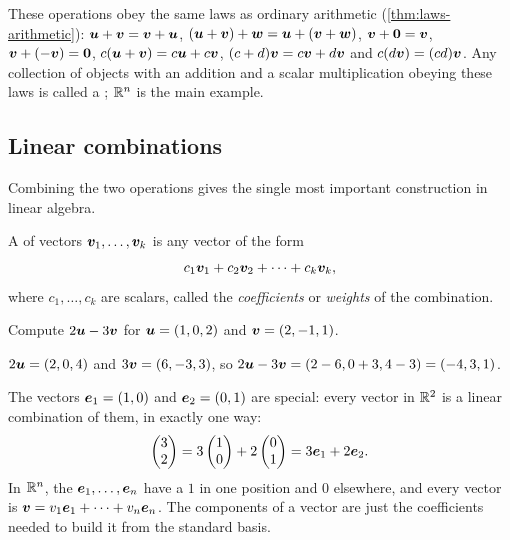 These operations obey the same laws as ordinary arithmetic
(\cref{thm:laws-arithmetic}): $\bm{u} + \bm{v} = \bm{v} + \bm{u}$,
$(\bm{u} + \bm{v}) + \bm{w} = \bm{u} + (\bm{v} + \bm{w})$, $\bm{v} + \bm{0} = \bm{v}$,
$\bm{v} + (-\bm{v}) = \bm{0}$, $c(\bm{u} + \bm{v}) = c\bm{u} + c\bm{v}$, $(c + d)\bm{v} = c\bm{v} +
d\bm{v}$ and $c(d\bm{v}) = (cd)\bm{v}$. Any collection of objects with an addition and a
scalar multiplication obeying these laws is called a ; $\mathbb{R}^n$
is the main example.

\subsection{Linear combinations}

Combining the two operations gives the single most important construction in
linear algebra.

\begin{definition}\label{def:linear-combination}
A  of vectors $\bm{v}_1, \dots, \bm{v}_k$ is any vector of
the form
\[
  c_1\bm{v}_1 + c_2\bm{v}_2 + \dots + c_k\bm{v}_k ,
\]
where $c_1, \dots, c_k$ are scalars, called the \emph{coefficients} or
\emph{weights} of the combination.
\end{definition}

\begin{example}\label{ex:linear-combination}
Compute $2\bm{u} - 3\bm{v}$ for $\bm{u} = (1, 0, 2)$ and $\bm{v} = (2, -1, 1)$.

\sol $2\bm{u} = (2, 0, 4)$ and $3\bm{v} = (6, -3, 3)$, so
$2\bm{u} - 3\bm{v} = (2 - 6, 0 + 3, 4 - 3) = (-4, 3, 1)$.
\end{example}

The vectors $\bm{e}_1 = (1, 0)$ and $\bm{e}_2 = (0, 1)$ are special: every vector in
$\mathbb{R}^2$ is a linear combination of them, in exactly one way:
\[
  \begin{pmatrix} 3 \\ 2 \end{pmatrix}
  = 3\begin{pmatrix} 1 \\ 0 \end{pmatrix}
  + 2\begin{pmatrix} 0 \\ 1 \end{pmatrix}
  = 3\bm{e}_1 + 2\bm{e}_2 .
\]
In $\mathbb{R}^n$, the 
$\bm{e}_1, \dots, \bm{e}_n$ have a $1$ in one position and $0$ elsewhere, and every
vector is $\bm{v} = v_1\bm{e}_1 + \dots + v_n\bm{e}_n$. The components of a vector are
just the coefficients needed to build it from the standard basis.

